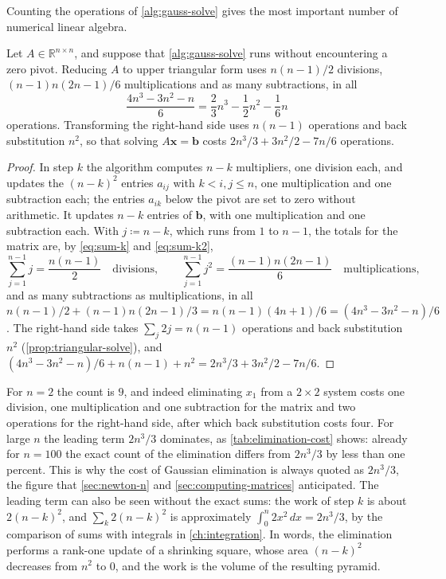 Counting the operations of \cref{alg:gauss-solve} gives the most important number of numerical linear algebra.

\begin{proposition}
\label{prop:elimination-cost}
Let $A\in\mathbb R^{n\times n}$, and suppose that \cref{alg:gauss-solve} runs without encountering a zero pivot. Reducing $A$ to upper triangular form uses $n(n-1)/2$ divisions, $(n-1)n(2n-1)/6$ multiplications and as many subtractions, in all
\[
\frac{4n^3-3n^2-n}6=\frac23n^3-\frac12n^2-\frac16n
\]
operations. Transforming the right-hand side uses $n(n-1)$ operations and back substitution $n^2$, so that solving $A\mathbf x=\mathbf b$ costs $2n^3/3+3n^2/2-7n/6$ operations.
\end{proposition}

\begin{proof}
In step $k$ the algorithm computes $n-k$ multipliers, one division each, and updates the $(n-k)^2$ entries $a_{ij}$ with $k<i,j\le n$, one multiplication and one subtraction each; the entries $a_{ik}$ below the pivot are set to zero without arithmetic. It updates $n-k$ entries of $\mathbf b$, with one multiplication and one subtraction each. With $j\coloneqq n-k$, which runs from $1$ to $n-1$, the totals for the matrix are, by \eqref{eq:sum-k} and \eqref{eq:sum-k2},
\[
\sum_{j=1}^{n-1}j=\frac{n(n-1)}2\quad\text{divisions},\qquad\sum_{j=1}^{n-1}j^2=\frac{(n-1)n(2n-1)}6\quad\text{multiplications},
\]
and as many subtractions as multiplications,
in all $n(n-1)/2+(n-1)n(2n-1)/3=n(n-1)(4n+1)/6=(4n^3-3n^2-n)/6$. The right-hand side takes $\sum_j2j=n(n-1)$ operations and back substitution $n^2$ (\cref{prop:triangular-solve}), and $(4n^3-3n^2-n)/6+n(n-1)+n^2=2n^3/3+3n^2/2-7n/6$.
\end{proof}

For $n=2$ the count is $9$, and indeed eliminating $x_1$ from a $2\times2$ system costs one division, one multiplication and one subtraction for the matrix and two operations for the right-hand side, after which back substitution costs four. For large $n$ the leading term $2n^3/3$ dominates, as \cref{tab:elimination-cost} shows: already for $n=100$ the exact count of the elimination differs from $2n^3/3$ by less than one percent. This is why the cost of Gaussian elimination is always quoted as $2n^3/3$, the figure that \cref{sec:newton-n} and \cref{sec:computing-matrices} anticipated. The leading term can also be seen without the exact sums: the work of step $k$ is about $2(n-k)^2$, and $\sum_k2(n-k)^2$ is approximately $\int_0^n2x^2\,dx=2n^3/3$, by the comparison of sums with integrals in \cref{ch:integration}. In words, the elimination performs a rank-one update of a shrinking square, whose area $(n-k)^2$ decreases from $n^2$ to $0$, and the work is the volume of the resulting pyramid.

